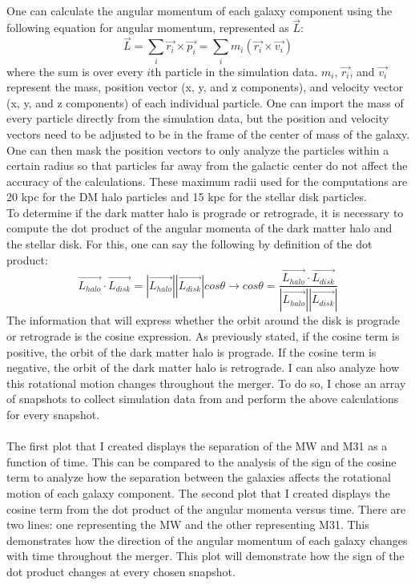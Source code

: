 \documentclass[fleqn,usenatbib]{mnras}
\begin{document}
\paragraph{} One can calculate the angular momentum of each galaxy component using the following equation for angular momentum, represented as $\vec{L}$:
\begin{equation}
    \vec{L} = \sum_{i} \vec{r_i} \times \vec{p_i} = \sum_{i} m_i (\vec{r_i} \times \vec{v_i})
\end{equation}
where the sum is over every $i$th particle in the simulation data. $m_i$, $\vec{r_i}$, and $\vec{v_i}$ represent the mass, position vector (x, y, and z components), and velocity vector (x, y, and z components) of each individual particle. One can import the mass of every particle directly from the simulation data, but the position and velocity vectors need to be adjusted to be in the frame of the center of mass of the galaxy. One can then mask the position vectors to only analyze the particles within a certain radius so that particles far away from the galactic center do not affect the accuracy of the calculations. These maximum radii used for the computations are 20 kpc for the DM halo particles and 15 kpc for the stellar disk particles.
\\To determine if the dark matter halo is prograde or retrograde, it is necessary to compute the dot product of the angular momenta of the dark matter halo and the stellar disk. For this, one can say the following by definition of the dot product:
\begin{equation}
    \vec{L_{halo}} \cdot \vec{L_{disk}} = |\vec{L_{halo}}||\vec{L_{disk}}|cos\theta \rightarrow cos\theta = \frac{\vec{L_{halo}} \cdot \vec{L_{disk}}}{|\vec{L_{halo}}||\vec{L_{disk}}|}
\end{equation}
The information that will express whether the orbit around the disk is prograde or retrograde is the cosine expression. As previously stated, if the cosine term is positive, the orbit of the dark matter halo is prograde. If the cosine term is negative, the orbit of the dark matter halo is retrograde. I can also analyze how this rotational motion changes throughout the merger. To do so, I chose an array of snapshots to collect simulation data from and perform the above calculations for every snapshot.

\paragraph{} The first plot that I created displays the separation of the MW and M31 as a function of time. This can be compared to the analysis of the sign of the cosine term to analyze how the separation between the galaxies affects the rotational motion of each galaxy component. The second plot that I created displays the cosine term from the dot product of the angular momenta versus time. There are two lines: one representing the MW and the other representing M31. This demonstrates how the direction of the angular momentum of each galaxy changes with time throughout the merger. This plot will demonstrate how the sign of the dot product changes at every chosen snapshot.
\end{document}
